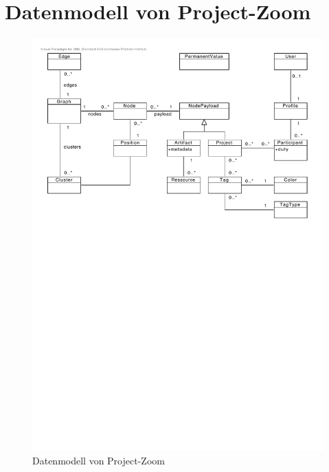 \section{Datenmodell von Project-Zoom}
\begin{figure}[h]  
  \centering     
  \includegraphics[width=1.0\textwidth]{img/complete_model.pdf}  
   \caption{Datenmodell von Project-Zoom}
  \label{fig:complete-model} 
\end{figure}

